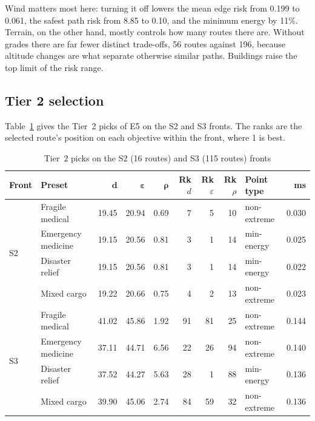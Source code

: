 Wind matters most here: turning it off lowers the mean edge risk
from 0.199 to 0.061, the safest path risk from 8.85 to 0.10, and the minimum energy by
11\%. Terrain, on the other hand, mostly controls how many routes there are. Without
grades there are far fewer distinct trade-offs, 56 routes against 196, because altitude
changes are what separate otherwise similar paths. Buildings raise the top limit of the
risk range.

\subsection{Tier 2 selection}\label{sec:perf-tier2}

Table~\ref{tab:tier2} gives the Tier~2 picks of E5 on the S2 and S3 fronts. The ranks
are the selected route's position on each objective within the front, where 1 is best.

\begin{table}[!htbp]
\centering
\caption{Tier~2 picks on the S2 (16 routes) and S3 (115 routes) fronts}\label{tab:tier2}
\footnotesize
\begin{tabular}{|l|l|r|r|r|r|r|r|l|r|}
\hline
\textbf{Front} & \textbf{Preset} & $\boldsymbol{d}$ & $\boldsymbol{\varepsilon}$ & $\boldsymbol{\rho}$ & \textbf{Rk $d$} & \textbf{Rk $\varepsilon$} & \textbf{Rk $\rho$} & \textbf{Point type} & \textbf{ms}\\
\hline
\multirow{4}{*}{S2} & Fragile medical & 19.45 & 20.94 & 0.69 & 7 & 5 & 10 & non-extreme & 0.030\\
 & Emergency medicine & 19.15 & 20.56 & 0.81 & 3 & 1 & 14 & min-energy & 0.025\\
 & Disaster relief & 19.15 & 20.56 & 0.81 & 3 & 1 & 14 & min-energy & 0.022\\
 & Mixed cargo & 19.22 & 20.66 & 0.75 & 4 & 2 & 13 & non-extreme & 0.023\\
\hline
\multirow{4}{*}{S3} & Fragile medical & 41.02 & 45.86 & 1.92 & 91 & 81 & 25 & non-extreme & 0.144\\
 & Emergency medicine & 37.11 & 44.71 & 6.56 & 22 & 26 & 94 & non-extreme & 0.140\\
 & Disaster relief & 37.52 & 44.27 & 5.63 & 28 & 1 & 88 & min-energy & 0.136\\
 & Mixed cargo & 39.90 & 45.06 & 2.74 & 84 & 59 & 32 & non-extreme & 0.136\\
\hline
\end{tabular}
\end{table}

